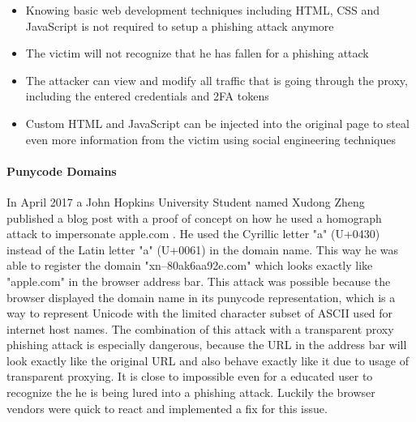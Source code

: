 \documentclass[12pt]{scrbook}
\begin{document}
\begin{itemize}
	\item Knowing basic web development techniques including HTML,
	      CSS and JavaScript is not required to setup a phishing attack anymore
	\item The victim will not recognize that he has fallen for a phishing attack
	\item The attacker can view and modify all traffic that is going through the
	      proxy, including the entered credentials and 2FA tokens
	\item Custom HTML and JavaScript can be injected into the original page to
	      steal even more information from the victim using social engineering
	      techniques
\end{itemize}

\paragraph{Punycode Domains}
In April 2017 a John Hopkins University Student named Xudong Zheng published a
blog post with a proof of concept on how he used a homograph attack to
impersonate apple.com \cite{punycodePhishing}. He used the Cyrillic letter "a" (U+0430) instead of the Latin letter "a" (U+0061) in the domain name. This way he was able to register
the domain "xn--80ak6aa92e.com" which looks exactly like "apple.com" in the
browser address bar. This attack was possible because the browser displayed the
domain name in its punycode representation, which is a way to represent Unicode
with the limited character subset of ASCII used for internet host names. The
combination of this attack with a transparent proxy phishing attack is
especially dangerous, because the URL in the address bar will look exactly like
the original URL and also behave exactly like it due to usage of transparent
proxying. It is close to impossible even for a educated user to recognize the he
is being lured into a phishing attack. Luckily the browser vendors were quick to
react and implemented a fix for this issue.
\end{document}
